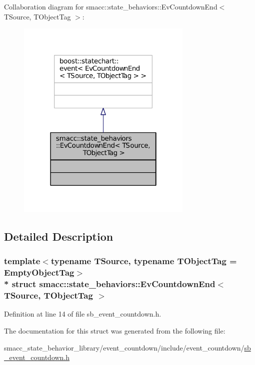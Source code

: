 Collaboration diagram for smacc\+:\+:state\+\_\+behaviors\+:\+:Ev\+Countdown\+End$<$ T\+Source, T\+Object\+Tag $>$\+:
\nopagebreak
\begin{figure}[H]
\begin{center}
\leavevmode
\includegraphics[width=238pt]{structsmacc_1_1state__behaviors_1_1EvCountdownEnd__coll__graph}
\end{center}
\end{figure}


\subsection{Detailed Description}
\subsubsection*{template$<$typename T\+Source, typename T\+Object\+Tag = Empty\+Object\+Tag$>$\\*
struct smacc\+::state\+\_\+behaviors\+::\+Ev\+Countdown\+End$<$ T\+Source, T\+Object\+Tag $>$}



Definition at line 14 of file sb\+\_\+event\+\_\+countdown.\+h.



The documentation for this struct was generated from the following file\+:\begin{DoxyCompactItemize}
\item 
smacc\+\_\+state\+\_\+behavior\+\_\+library/event\+\_\+countdown/include/event\+\_\+countdown/\hyperlink{sb__event__countdown_8h}{sb\+\_\+event\+\_\+countdown.\+h}\end{DoxyCompactItemize}
